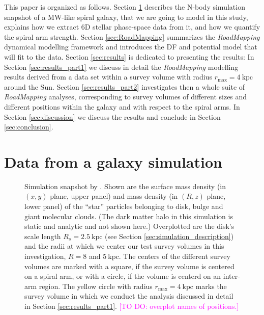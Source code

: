 \documentclass[iop,revtex4,numberedappendix,appendixfloats]{emulateapj}
\newcommand{\RM}{{\sl RoadMapping}}
\newcommand{\Wilma}[1]{\textcolor{Magenta}{#1}}
\begin{document}
This paper is organized as follows. Section \ref{sec:simulation} describes the N-body simulation snapshot of a MW-like spiral galaxy, that we are going to model in this study, explains how we extract 6D stellar phase-space data from it, and how we quantify the spiral arm strength. Section \ref{sec:RoadMapping} summarizes the \RM{} dynamical modelling framework and introduces the DF and potential model that will fit to the data. Section \ref{sec:results} is dedicated to presenting the results: In Section \ref{sec:results_part1} we discuss in detail the \RM{} modelling results derived from a data set within a survey volume with radius $r_\text{max}=4~\text{kpc}$ around the Sun. Section \ref{sec:results_part2} investigates then a whole suite of \RM{} analyses, corresponding to survey volumes of different sizes and different positions within the galaxy and with respect to the spiral arms. In Section \ref{sec:discussion} we discuss the results and conclude in Section \ref{sec:conclusion}.


\section{Data from a galaxy simulation} \label{sec:simulation}

\begin{figure}[!htbp]
\caption{Simulation snapshot by \citet{2013ApJ...766...34D} . Shown are the surface mass density (in $(x,y)$ plane, upper panel) and mass density (in $(R,z)$ plane, lower panel) of the ``star'' particles belonging to disk, bulge and giant molecular clouds. (The dark matter halo in this simulation is static and analytic and not shown here.) Overplotted are the disk's scale length $R_s=2.5~\text{kpc}$ (see Section \ref{sec:simulation_description}) and the radii at which we center our test survey volumes in this investigation, $R=8$ and $5~\text{kpc}$. The centers of the different survey volumes are marked with a square, if the survey volume is centered on a spiral arm, or with a circle, if the volume is centerd on an inter-arm region. The yellow circle with radius $r_\text{max}=4~\text{kpc}$ marks the survey volume in which we conduct the analysis discussed in detail in Section \ref{sec:results_part1}. \Wilma{[TO DO: overplot names of positions.]}}
\label{fig:simulation}
\end{figure}
\end{document}
